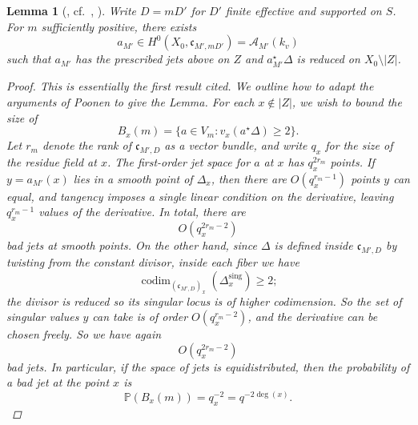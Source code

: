 \documentclass[openany]{amsbook}
\newtheorem{lemma}[theorem]{Lemma}
\theoremstyle{definition}
\theoremstyle{remark}
\numberwithin{equation}{section}
\newcommand{\cA}{\mathcal{A}}
\renewcommand{\-}{\operatorname{-}}
\newcommand{\on}[1]{\operatorname{#1}}
\newcommand{\fc}{\mathfrak{c}}
\newcommand{\codim}{\on{codim}}
\begin{document}
\begin{lemma}[{\cite[Proposition 5.1.1]{ngoetal}, cf.\ \cite[Theorem 1.2]{poonenbertini}, \cite[Theorem 8.1]{poonensquarefree}}]\label{lem.bert.glob}
    Write $D = mD'$ for $D'$ finite effective and supported on $S$. For $m$ sufficiently positive, there exists
    $$
        a_{M'} \in H^0(X_0, \fc_{M',mD'}) = \cA_{M'}(k_v)
    $$
    such that $a_{M'}$ has the prescribed jets above on $Z$ and $a^\star_{M'} \Delta$ is reduced on $X_0 \setminus |Z|$.
    \begin{proof}
        This is essentially the first result cited. We outline how to adapt the arguments of Poonen to give the Lemma. For each $x \not\in |Z|$, we wish to bound the size of
        $$
            B_x(m) = \{a \in V_m : v_x(a^\star \Delta) \ge 2\}.
        $$
        Let $r_m$ denote the rank of $\fc_{M',D}$ as a vector bundle, and write $q_x$ for the size of the residue field at $x$. The first-order jet space for $a$ at $x$ has $q_x^{2r_m}$ points. If $y = a_{M'}(x)$ lies in a smooth point of $\Delta_x$, then there are $O(q_x^{r_m-1})$ points $y$ can equal, and tangency imposes a single linear condition on the derivative, leaving $q_x^{r_m-1}$ values of the derivative. In total, there are 
        $$
            O(q_x^{2r_m - 2}) 
        $$
        bad jets at smooth points. On the other hand, since $\Delta$ is defined inside $\fc_{M',D}$ by twisting from the constant divisor, inside each fiber we have
        $$
            \codim_{(\fc_{M',D})_x}(\Delta_x^{\mathrm{sing}}) \ge 2;
        $$
        the divisor is reduced so its singular locus is of higher codimension. So the set of singular values $y$ can take is of order $O(q_x^{r_m - 2})$, and the derivative can be chosen freely. So we have again 
        $$
            O(q_x^{2r_m - 2})
        $$
        bad jets. In particular, if the space of jets is equidistributed, then the probability of a bad jet at the point $x$ is
        $$
            \mathbb{P}(B_x(m)) = q_x^{-2} = q^{-2\deg(x)}.
        $$


\end{proof}
\end{lemma}
\end{document}
